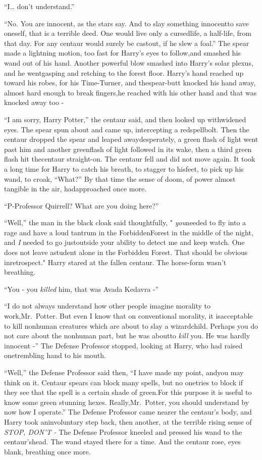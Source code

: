 ``I\ldots{} don't understand.''

``No. You are innocent, as the stars say. And to slay something innocentto save oneself, that is a terrible deed. One would live only a cursedlife, a half-life, from that day. For any centaur would surely be castout, if he slew a foal.''
The spear made a lightning motion, too fast for Harry's eyes to follow,and smashed his wand out of his hand.
Another powerful blow smashed into Harry's solar plexus, and he wentgasping and retching to the forest floor.
Harry's hand reached up toward his robes, for his Time-Turner, and thespear-butt knocked his hand away, almost hard enough to break fingers,he reached with his other hand and that was knocked away too -

``I am sorry, Harry Potter,'' the centaur said, and then looked up withwidened eyes. The spear spun about and came up, intercepting a redspellbolt. Then the centaur dropped the spear and leaped awaydesperately, a green flash of light went past him and another greenflash of light followed in its wake, then a third green flash hit thecentaur straight-on.
The centaur fell and did not move again.
It took a long time for Harry to catch his breath, to stagger to hisfeet, to pick up his wand, to croak, ``What?''
By that time the sense of doom, of power almost tangible in the air, hadapproached once more.

``P-Professor Quirrell? What are you doing here?''

``Well,'' the man in the black cloak said thoughtfully, " \emph{you}needed to fly into a rage and have a loud tantrum in the ForbiddenForest in the middle of the night, and \emph{I} needed to go justoutside your ability to detect me and keep watch. One does not leave astudent alone in the Forbidden Forest. That should be obvious inretrospect."
Harry stared at the fallen centaur.
The horse-form wasn't breathing.

``You - you \emph{killed} him, that was Avada Kedavra -''

``I do not always understand how other people imagine morality to work,Mr.~Potter. But even I know that on conventional morality, it isacceptable to kill nonhuman creatures which are about to slay a wizardchild. Perhaps you do not care about the nonhuman part, but he was aboutto \emph{kill} you. He was hardly innocent -''
The Defense Professor stopped, looking at Harry, who had raised onetrembling hand to his mouth.

``Well,'' the Defense Professor said then, ``I have made my point, andyou may think on it. Centaur spears can block many spells, but no onetries to block if they see that the spell is a certain shade of green.For this purpose it is useful to know some green stunning hexes. Really,Mr.~Potter, you should understand by now how I operate.''
The Defense Professor came nearer the centaur's body, and Harry took aninvoluntary step back, then another, at the terrible rising sense of
\emph{STOP, DON'T -}
The Defense Professor kneeled and pressed his wand to the centaur'shead.
The wand stayed there for a time.
And the centaur rose, eyes blank, breathing once more.

